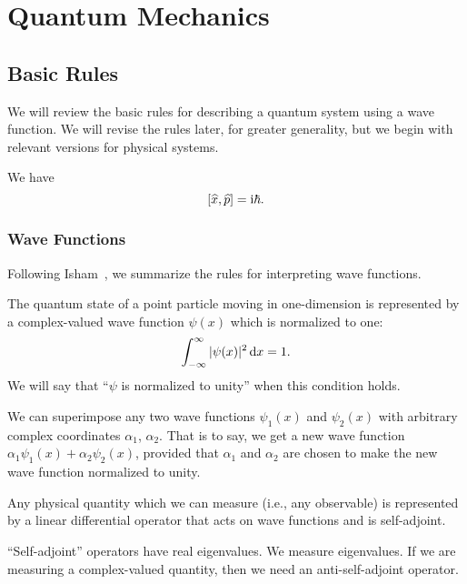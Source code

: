 \chapter{Quantum Mechanics}

\section{Basic Rules}

\M We will review the basic rules for describing a quantum system using
a wave function. We will revise the rules later, for greater generality,
but we begin with relevant versions for physical systems.

We have
\begin{equation}\label{eq:position-momentum-uncertainty-commutator}
[\widehat{x},\widehat{p}] = \mathrm{i}\hbar.
\end{equation}


\subsection{Wave Functions}

\M Following Isham~\cite{Isham:1995lq}, we summarize the rules for
interpreting wave functions.

The quantum state of a point particle moving in one-dimension is
represented by a complex-valued wave function $\psi(x)$ which is
normalized to one:
\begin{equation}
\int^{\infty}_{-\infty}|\psi(x)|^{2}\,\mathrm{d} x = 1.
\end{equation}
We will say that ``$\psi$ is normalized to unity'' when this condition holds.

We can superimpose any two wave functions $\psi_{1}(x)$ and
$\psi_{2}(x)$ with arbitrary complex coordinates $\alpha_{1}$, $\alpha_{2}$.
That is to say, we get a new wave function
$\alpha_{1}\psi_{1}(x) + \alpha_{2}\psi_{2}(x)$, provided that
$\alpha_{1}$ and $\alpha_{2}$ are chosen to make the new wave function
normalized to unity.

Any physical quantity which we can measure (i.e., any observable) is
represented by a linear differential operator that acts on wave functions
and is self-adjoint.

\begin{remark}
``Self-adjoint'' operators have real eigenvalues. We measure
eigenvalues. If we are measuring a complex-valued quantity, then we
need an anti-self-adjoint operator.
\end{remark}

